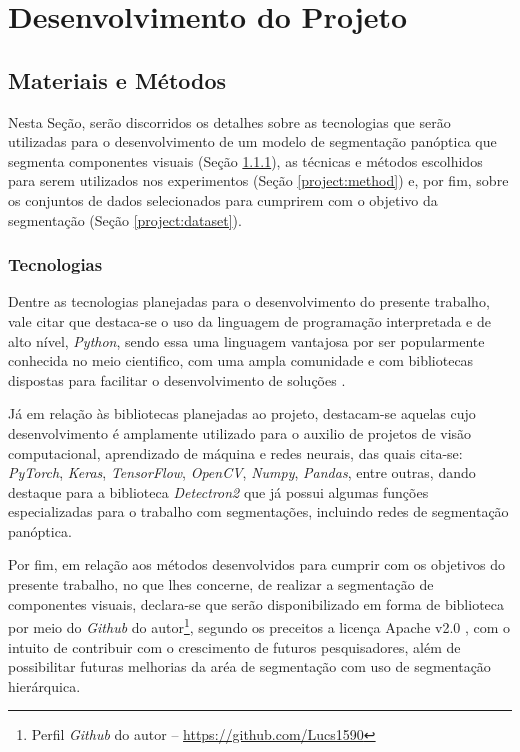\newpage
\clearpage

\section{Desenvolvimento do Projeto}
\label{project:project}

\subsection{Materiais e Métodos}
\label{project:matmet}
Nesta Seção, serão discorridos os detalhes sobre as tecnologias que serão utilizadas para o desenvolvimento de um modelo de segmentação panóptica que segmenta componentes visuais (Seção \ref{project:tec}), as técnicas e métodos escolhidos para serem utilizados nos experimentos (Seção \ref{project:method}) e, por fim, sobre os conjuntos de dados selecionados para cumprirem com o objetivo da segmentação (Seção \ref{project:dataset}).


\subsubsection{Tecnologias}
\label{project:tec}
Dentre as tecnologias planejadas para o desenvolvimento do presente trabalho, vale citar que destaca-se o uso da linguagem de programação interpretada e de alto nível, \textit{Python}, sendo essa uma linguagem vantajosa por ser popularmente conhecida no meio cientifico, com uma ampla comunidade e com  bibliotecas dispostas para facilitar o desenvolvimento de soluções \cite{Millman2011PythonEngineers}.

Já em relação às bibliotecas planejadas ao projeto, destacam-se aquelas cujo desenvolvimento é amplamente utilizado para o auxilio de projetos de visão computacional, aprendizado de máquina e redes neurais, das quais cita-se: \textit{PyTorch}, \textit{Keras}, \textit{TensorFlow}, \textit{OpenCV}, \textit{Numpy}, \textit{Pandas}, entre outras, dando destaque para a biblioteca \textit{Detectron2} \cite{detectron2} que já possui algumas funções especializadas para o trabalho com segmentações, incluindo redes de segmentação panóptica.

Por fim, em relação aos métodos desenvolvidos para cumprir com os objetivos do presente trabalho, no que lhes concerne, de realizar a segmentação de componentes visuais, declara-se que serão disponibilizado em forma de biblioteca por meio do \textit{Github} do autor\footnote{Perfil \textit{Github} do autor – \url{https://github.com/Lucs1590}}, segundo os preceitos a licença Apache v2.0 \cite{Licenses}, com o intuito de contribuir com o crescimento de futuros pesquisadores, além de possibilitar futuras melhorias da aréa de segmentação com uso de segmentação hierárquica.


